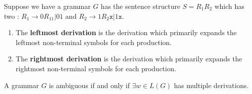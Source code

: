 \begin{defn}
    Suppose we have a grammar $G$ has the sentence structure $S=R_1 R_2$ which has two : $R_1 \to 0R_11 | 01$ and $R_2 \to 1R_2\texttt{x} | 1\texttt{x}$.

    \begin{enumerate}
        \item The \textbf{leftmost derivation} is the derivation which primarily expands the leftmost non-terminal symbols for each production.
        \item The \textbf{rightmost derivation} is the derivation which primarily expands the rightmost non-terminal symbols for each production.
    \end{enumerate}
\end{defn}

\begin{defn}
    A grammar $G$ is ambiguous if and only if $\exists w\in L(G)$ has multiple  derivations.
\end{defn}